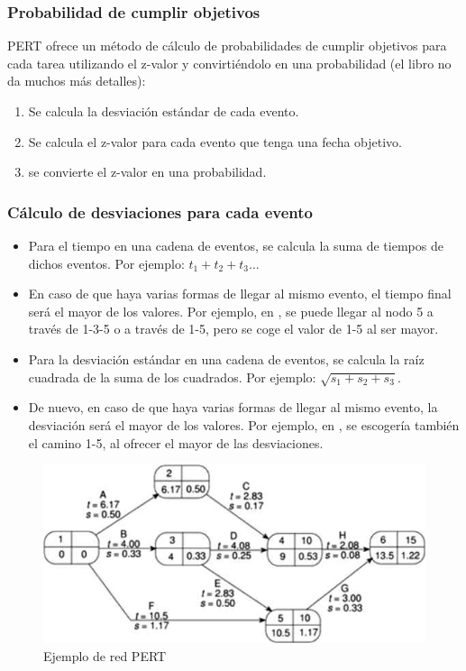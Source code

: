 \documentclass[12pt]{article}
\begin{document}
\subsubsection{Probabilidad de cumplir objetivos}
\label{7.10.4}

{PERT ofrece un método de cálculo de probabilidades de cumplir objetivos para cada tarea utilizando el z-valor y convirtiéndolo en una probabilidad (el libro no da muchos más detalles):}

\begin{enumerate}
    \item Se calcula la desviación estándar de cada evento.
    \item Se calcula el z-valor para cada evento que tenga una fecha objetivo.
    \item se convierte el z-valor en una probabilidad.
\end{enumerate}

\subsubsection{Cálculo de desviaciones para cada evento}
\label{7.10.5}

\begin{itemize}
    \item {Para el tiempo en una cadena de eventos, se calcula la suma de tiempos de dichos eventos. Por ejemplo: $t_1 + t_2 + t_3$...}
    \item {En caso de que haya varias formas de llegar al mismo evento, el tiempo final será el mayor de los valores. Por ejemplo, en , se puede llegar al nodo 5 a través de 1-3-5 o a través de 1-5, pero se coge el valor de 1-5 al ser mayor.}
    \item {Para la desviación estándar en una cadena de eventos, se calcula la raíz cuadrada de la suma de los cuadrados. Por ejemplo: $\sqrt{s_1 + s_2 + s_3}$.}
    \item {De nuevo, en caso de que haya varias formas de llegar al mismo evento, la desviación será el mayor de los valores. Por ejemplo, en , se escogería también el camino 1-5, al ofrecer el mayor de las desviaciones.}
\end{itemize}

\begin{figure} [ht]
    \centering
    \includegraphics[keepaspectratio=true, scale=1.0]{images/Red_PERT.jpg}
    \caption{Ejemplo de red PERT}
    \label{fig:7.3}
\end{figure}
\end{document}
